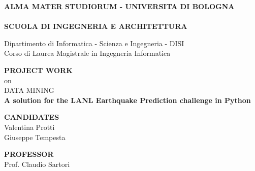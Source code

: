 \thispagestyle{empty}
\begin{titlepage}

\vspace*{-1.5cm}
\begin{center}
  \large
  \textbf{ALMA MATER STUDIORUM - UNIVERSITA DI BOLOGNA}\\
  
  \hrulefill\\
  
  \textbf{SCUOLA DI INGEGNERIA  E ARCHITETTURA}\\
  \vspace*{.75cm}
  
  
  Dipartimento di Informatica - Scienza e Ingegneria - DISI\\
  Corso di Laurea Magistrale in Ingegneria Informatica\\
  
  \vspace*{1.2cm}
  
  
  \textbf{PROJECT WORK}\\
  \vspace*{.4cm}
  on\\
  \vspace*{.4cm}
  DATA MINING\\

  \vspace*{2cm} \LARGE
  \textbf{A solution for the LANL Earthquake Prediction challenge in Python}\\
 \end{center}
 
 \vspace*{3cm}
 
 \begin{flushleft}
  \textbf{CANDIDATES}\\ Valentina Protti \\ Giuseppe Tempesta \\
\end{flushleft}

\vspace*{-2cm}

 \begin{flushright}
  \textbf{PROFESSOR}\\ Prof. Claudio Sartori \\
 \end{flushright}


\vspace*{2cm}

\clearpage
\end{titlepage}